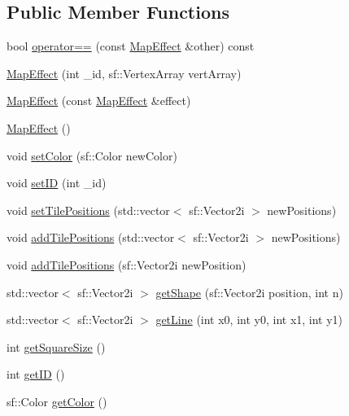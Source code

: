 \subsection*{Public Member Functions}
\begin{DoxyCompactItemize}
\item 
bool \mbox{\hyperlink{class_map_effect_a4782568b5d45629c080fdf183943ea29}{operator==}} (const \mbox{\hyperlink{class_map_effect}{Map\+Effect}} \&other) const
\item 
\mbox{\hyperlink{class_map_effect_ac517bf5e557ac443b45a1dedb2b216ab}{Map\+Effect}} (int \+\_\+id, sf\+::\+Vertex\+Array vert\+Array)
\item 
\mbox{\hyperlink{class_map_effect_aff543fedf91ca1798942f756c8388aa3}{Map\+Effect}} (const \mbox{\hyperlink{class_map_effect}{Map\+Effect}} \&effect)
\item 
\mbox{\hyperlink{class_map_effect_aa271c0e92d24c599620890409a7a0de6}{Map\+Effect}} ()
\item 
void \mbox{\hyperlink{class_map_effect_a099bb0a933606b5fb24e0eb91a9f78b6}{set\+Color}} (sf\+::\+Color new\+Color)
\item 
void \mbox{\hyperlink{class_map_effect_a7945a4888b4f7d3d14990beac98d6b46}{set\+ID}} (int \+\_\+id)
\item 
void \mbox{\hyperlink{class_map_effect_af79dd085aefbd1cdd92e9e9aa695592a}{set\+Tile\+Positions}} (std\+::vector$<$ sf\+::\+Vector2i $>$ new\+Positions)
\item 
void \mbox{\hyperlink{class_map_effect_a241e9bc24e9ded3426acedb2a36bc15b}{add\+Tile\+Positions}} (std\+::vector$<$ sf\+::\+Vector2i $>$ new\+Positions)
\item 
void \mbox{\hyperlink{class_map_effect_aa3ede6caaa085ad57f7cc5be0b143ca2}{add\+Tile\+Positions}} (sf\+::\+Vector2i new\+Position)
\item 
std\+::vector$<$ sf\+::\+Vector2i $>$ \mbox{\hyperlink{class_map_effect_a4557d94941b97471dce7ac47e30825c5}{get\+Shape}} (sf\+::\+Vector2i position, int n)
\item 
std\+::vector$<$ sf\+::\+Vector2i $>$ \mbox{\hyperlink{class_map_effect_a7aeebd5eef57c00feabca583a38c5361}{get\+Line}} (int x0, int y0, int x1, int y1)
\item 
int \mbox{\hyperlink{class_map_effect_aa96fb614319095fdc9003d85ea4647e2}{get\+Square\+Size}} ()
\item 
int \mbox{\hyperlink{class_map_effect_af05848201790b0038c5b61659b116706}{get\+ID}} ()
\item 
sf\+::\+Color \mbox{\hyperlink{class_map_effect_a8c3e266da325516b48983cf7cf238cf6}{get\+Color}} ()

\end{DoxyCompactItemize}
